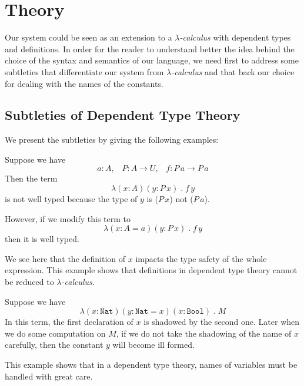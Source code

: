 \chapter{Theory}
Our system could be seen as an extension to a \emph{$\lambda$-calculus} with dependent types and definitions. In order for the reader to understand better the idea behind the choice of the syntax and semantics of our language, we need first to address some subtleties that differentiate our system from \emph{$\lambda$-calculus} and that back our choice for dealing with the names of the constants.

\section{Subtleties of Dependent Type Theory} \label{theory:subtleties}
We present the subtleties by giving the following examples: 

\begin{example}\label{theory:exa1}
  Suppose we have
  \[ a : A, \;\;\; P : A \to U, \;\;\; f : P \, a \to P \, a \]
  Then the term
  \[ \lambda (x : A) (y : P \, x) \; . \; f \, y \]
  is not well typed because the type of $y$ is ($P \, x$) not ($P \, a$).

  However, if we modify this term to
  \[ \lambda (x : A = a) (y : P \, x) \; . \; f \, y \]
  then it is well typed.

  We see here that the definition of $x$ impacts the type safety of the whole expression. This example shows that definitions in dependent type theory cannot be reduced to \emph{$\lambda$-calculus}.
\end{example}

\begin{example}\label{theory:exa2}
  Suppose we have
  \[ \lambda (x : \texttt{Nat}) (y : \texttt{Nat} = x) (x : \texttt{Bool}) \; . \; M \]
  In this term, the first declaration of $x$ is shadowed by the second one. Later when we do some computation on $M$, if we do not take the shadowing of the name of $x$ carefully, then the constant $y$ will become ill formed.

  This example shows that in a dependent type theory, names of variables must be handled with great care.
\end{example}

